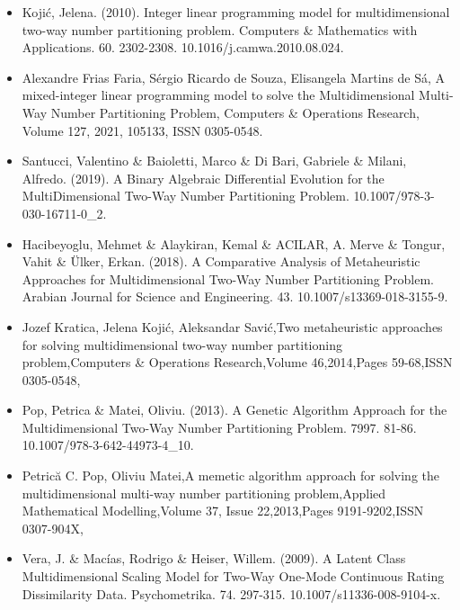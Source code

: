 \documentclass[13pt,a4paper]{article}
\begin{document}
\begin{itemize}
    \item Kojić, Jelena. (2010). Integer linear programming model for multidimensional two-way number partitioning problem. Computers \& Mathematics with Applications. 60. 2302-2308. 10.1016/j.camwa.2010.08.024. 
    \item Alexandre Frias Faria, Sérgio Ricardo de Souza, Elisangela Martins de Sá, A mixed-integer linear programming model to solve the Multidimensional Multi-Way Number Partitioning Problem, Computers \& Operations Research, Volume 127, 2021, 105133, ISSN 0305-0548.
    \item Santucci, Valentino \& Baioletti, Marco \& Di Bari, Gabriele \& Milani, Alfredo. (2019). A Binary Algebraic Differential Evolution for the MultiDimensional Two-Way Number Partitioning Problem. 10.1007/978-3-030-16711-0\_2. 
    \item Hacibeyoglu, Mehmet \& Alaykiran, Kemal \& ACILAR, A. Merve \& Tongur, Vahit \& Ülker, Erkan. (2018). A Comparative Analysis of Metaheuristic Approaches for Multidimensional Two-Way Number Partitioning Problem. Arabian Journal for Science and Engineering. 43. 10.1007/s13369-018-3155-9. 
    \item Jozef Kratica, Jelena Kojić, Aleksandar Savić,Two metaheuristic approaches for solving multidimensional two-way number partitioning problem,Computers \& Operations Research,Volume 46,2014,Pages 59-68,ISSN 0305-0548,
    \item Pop, Petrica \& Matei, Oliviu. (2013). A Genetic Algorithm Approach for the Multidimensional Two-Way Number Partitioning Problem. 7997. 81-86. 10.1007/978-3-642-44973-4\_10. 
    \item Petrică C. Pop, Oliviu Matei,A memetic algorithm approach for solving the multidimensional multi-way number partitioning problem,Applied Mathematical Modelling,Volume 37, Issue 22,2013,Pages 9191-9202,ISSN 0307-904X,
    \item Vera, J. \& Macías, Rodrigo \& Heiser, Willem. (2009). A Latent Class Multidimensional Scaling Model for Two-Way One-Mode Continuous Rating Dissimilarity Data. Psychometrika. 74. 297-315. 10.1007/s11336-008-9104-x.
\end{itemize}



\end{document}
